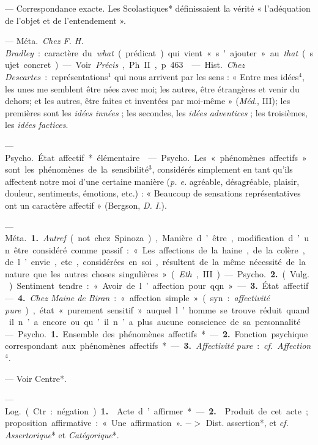 \begin{itemize}[leftmargin=1cm, label=, itemsep=1pt]
 — Correspondance exacte.
Les Scolastiques* définissaient la
vérité « l'adéquation de l’objet et de
l'entendement ».

 — \si{Méta.} {\it Chez F. H. Bradley} :
caractère du {\it what} (prédicat) qui
vient «s'ajouter » au {\it that} (sujet concret). — Voir {\it Précis}, Ph. II, p. 463.

 — \si{Hist.} {\it Chez Descartes} : représentations$^1$ qui nous
arrivent par les sens : « Entre mes
idées$^4$, les unes me semblent être
nées avec moi; les autres, être étrangères et venir du dehors; et les
autres, être faites et inventées par
moi-même » ({\it Méd}., III); les premières sont les {\it idées innées} ; les
secondes, les {\it idées adventices} ; les
troisièmes, les {\it idées factices}.

 — \si{Psycho.} État affectif*
élémentaire.

 — \si{Psycho.} Les « phénomènes
affectifs » sont les phénomènes de la
sensibilité$^3$, considérés simplement
en tant qu'ils affectent notre moi
d’une certaine manière ({\it p. e.} agréable,
désagréable, plaisir, douleur, sentiments, émotions, etc.) : « Beaucoup
de sensations représentatives ont un
caractère affectif » (Bergson, {\it D. I.}).

 — \si{Méta.} {\bf 1.} {\it Autref}. (not.
chez Spinoza), Manière d’être, modification d’un être considéré comme
passif : « Les affections de la haine,
de la colère, de l’envie, etc., considérées en soi, résultent de la même
nécessité de la nature que les autres
choses singulières » ({\it Eth}., III).

— \si{Psycho.} {\bf 2.} (\si{Vulg.}) Sentiment
tendre : « Avoir de l’affection pour
qqn ». — {\bf 3.} État affectif. — {\bf 4.} {\it Chez
Maine de Biran} : « affection simple »
(syn. : {\it affectivité pure}), état « purement sensitif » auquel l’homme se
trouve réduit quand il n’a encore ou
qu’il n’a plus aucune conscience de
sa personnalité.

 — \si{Psycho.} {\bf 1.} Ensemble
des phénomènes affectifs*. — {\bf 2.}
Fonction psychique correspondant
aux phénomènes affectifs*. — {\bf 3.}
{\it Affectivité pure} : {\it cf.}  {\it Affection}$^4$.

 — Voir Centre*.

 — \si{Log.} (Ctr. : négation).
 {\bf 1.}  Acte d’affirmer*. — {\bf 2.}  Produit de cet acte ;
proposition affirmative : « Une affirmation ».
$->$ Dist. assertion*, et {\it cf.}  {\it Assertorique}* et {\it Catégorique}*.


\end{itemize}
